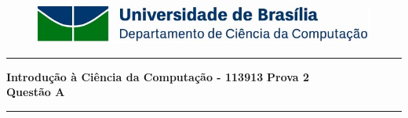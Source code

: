 \documentclass[a4paper, 12pt]{article}
\begin{document}
\begin{figure}[H]
	\includegraphics[scale=0.9]{UnB_CiC_Logo.jpg}
\end{figure}
\noindent\rule{\textwidth}{0.4pt}
\begin{center}
	\textbf{{\Large Introdução à Ciência da Computação - 113913}} \newline \newline
	\textbf{{\large Prova 2} \\
	\vspace{9pt}
	{\large Questão A}} \\
	\noindent\rule{\textwidth}{0.4pt}
	\newline
\end{center}
\end{document}
